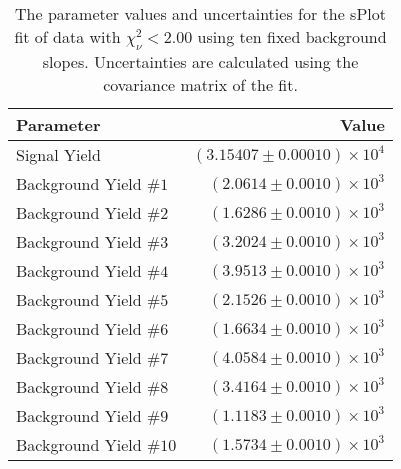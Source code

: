 
\begin{table}[ht]
    \begin{center}
        \begin{tabular}{lr}\toprule
            Parameter & Value \\\midrule
            Signal Yield & $(3.15407 \pm 0.00010) \times 10^{4}$ \\
            Background Yield $\#1$ & $(2.0614 \pm 0.0010) \times 10^{3}$ \\
            Background Yield $\#2$ & $(1.6286 \pm 0.0010) \times 10^{3}$ \\
            Background Yield $\#3$ & $(3.2024 \pm 0.0010) \times 10^{3}$ \\
            Background Yield $\#4$ & $(3.9513 \pm 0.0010) \times 10^{3}$ \\
            Background Yield $\#5$ & $(2.1526 \pm 0.0010) \times 10^{3}$ \\
            Background Yield $\#6$ & $(1.6634 \pm 0.0010) \times 10^{3}$ \\
            Background Yield $\#7$ & $(4.0584 \pm 0.0010) \times 10^{3}$ \\
            Background Yield $\#8$ & $(3.4164 \pm 0.0010) \times 10^{3}$ \\
            Background Yield $\#9$ & $(1.1183 \pm 0.0010) \times 10^{3}$ \\
            Background Yield $\#10$ & $(1.5734 \pm 0.0010) \times 10^{3}$ \\\bottomrule
        \end{tabular}
        \caption{The parameter values and uncertainties for the sPlot fit of data with $\chi^2_\nu < 2.00$ using ten fixed background slopes. Uncertainties are calculated using the covariance matrix of the fit.}\label{tab:splot-fit-results-chisqdof-2.00-fixed-10}
    \end{center}
\end{table}
